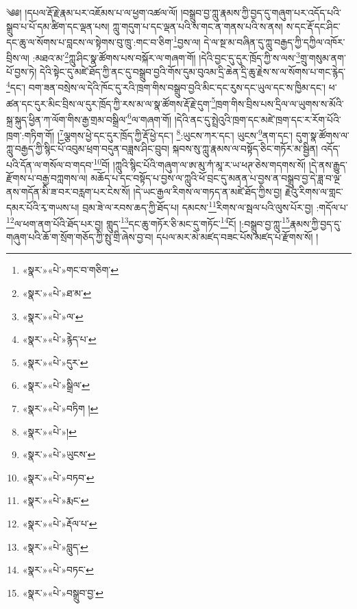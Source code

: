 ༄༅། །དཔལ་རྡོ་རྗེ་རྣམ་པར་འཇོམས་པ་ལ་ཕྱག་འཚལ་ལོ། །བསྒྲུབ་བྱ་ཀླུ་རྣམས་ཀྱི་བྱད་དུ་གཞུག་པར་འདོད་པའི་སྒྲུབ་པ་པོ་དམ་ཚིག་དང་ལྡན་པས། ཀླུ་གདུག་པ་དང་ལྡན་པའི་ས་གང་ན་གནས་པའི་ས་ནས། ས་དང་རྡོ་དང་ཤིང་དང་ཆུ་ལ་སོགས་པ་བླངས་ལ་སྟེགས་བུ་ཁྲུ་:གང་བ་ཅིག་\footnote{«སྣར་»«པེ་»གང་བ་གཅིག་}བྱས་ལ། དེ་ལ་སྔ་མ་བཞིན་དུ་ཀླུ་བརྒྱད་ཀྱི་དཀྱིལ་འཁོར་བྲིས་ལ། :མཐའ་མ་\footnote{«སྣར་»«པེ་»ཐ་མ་}ཀླུ་ཤིང་སྣ་ཚོགས་པས་བསྐོར་ལ་གཞག་གོ། །དེའི་བྱང་དུ་དུར་ཁྲོད་ཀྱི་ས་ལས་\footnote{«སྣར་»«པེ་»ལ་}གྲུ་གསུམ་ནག་པོ་བྱས་ཏེ། དེའི་སྟེང་དུ་མཛེ་ཐོད་ཀྱི་ནང་དུ་བསྒྲུབ་བྱའི་གོས་དུམ་བུའམ་དྲི་ཆེན་དྲི་ཆུ་རྗེས་ས་ལ་སོགས་པ་གང་རྙེད་\footnote{«སྣར་»«པེ་»རྙེད་པ་}དང་། བག་ཟན་བསྲེས་ལ་དེའི་ཁོང་དུ་རའི་ཁྲག་གིས་བསྒྲུབ་བྱའི་མིང་དང་རུས་དང་ཡུལ་དང་ས་ཁྱིམ་དང་། ཕ་ཚན་དང་དུར་མིང་བྲིས་ལ་དུར་ཁྲོད་ཀྱི་རས་མ་ལ་སྣ་ཚོགས་རྡོ་རྗེ་དུག་\footnote{«སྣར་»«པེ་»དུར་}ཁྲག་གིས་བྲིས་པས་དྲིལ་ལ་ཡུགས་ས་མོའི་སྐྲ་སྐུད་ཕྱིན་ཀ་ལོག་གིས་རྒྱ་གྲམ་བསྒྲིལ་\footnote{«སྣར་»«པེ་»སྒྲིལ་}ལ་གཞག་གོ། །དེའི་ནང་དུ་སྤྲེའུའི་ཁྲག་དང་མཛེ་ཁྲག་དང་ར་རོག་པོའི་ཁྲག་:གཏིག་གོ། །\footnote{«སྣར་»«པེ་»བཏིག །}ལྕགས་ཕྱེ་དང་དུར་ཁྲོད་ཀྱི་རྡོ་ཕྱེ་དང་། \footnote{«སྣར་»«པེ་»།  }:ཡུངས་ཀར་དང་། ཡུངས་\footnote{«སྣར་»«པེ་»ཡུངས་}ནག་དང་། དུག་སྣ་ཚོགས་ལ་ཀླུ་བརྒྱད་ཀྱི་སྙིང་པོ་འབུམ་ཕྲག་བདུན་བཟླས་ཤིང་བྲུབ། སྐབས་སུ་ཀླུ་རྣམས་ལ་བསྟོད་ཅིང་གཏོར་མ་སྦྱིན། འདོད་པའི་དོན་ལ་གསོལ་བ་གདབ་\footnote{«སྣར་»«པེ་»བཏབ་}བོ། །ཀླུའི་སྙིང་པོའི་གཞུག་ལ་ཨ་མུ་ཀཾ་མཱ་ར་ཡ་ཕཊ་ཅེས་གདགས་སོ། །དེ་ནས་རྒྱུད་རྫོགས་པ་བརྒྱ་བཀླགས་ལ། མཆོད་པ་དང་བསྟོད་པ་བྱས་ལ་ཀླུའི་ཕོ་བྲང་དུ་མནན་པ་བྱས་ན་བསྒྲུབ་བྱ་དེ་ཟླ་བ་ལྔ་ནས་གདོན་མི་ཟ་བར་བརླག་པར་ངེས་སོ། །དེ་ཡང་རྒྱལ་རིགས་ལ་གཏད་ན་མཛེ་ཐོད་ཀྱིས་བྱ། རྗེའུ་རིགས་ལ་གླང་དམར་པོའི་རྭ་གཡས་པ། བྲམ་ཟེ་ལ་རབས་ཆད་ཀྱི་ཐོད་པ། དམངས་\footnote{«སྣར་»«པེ་»རྨང་}རིགས་ལ་སྦལ་པའི་ལུས་པོར་བྱ། :གདོལ་པ་\footnote{«སྣར་»«པེ་»རྡོལ་པ་}ལ་ཕག་ནག་པོའི་ཐོད་པར་བྱ། གླུད་\footnote{«སྣར་»«པེ་»བླུད་}དང་ཆུ་གཏོར་ཅི་མང་དུ་གཏོང་\footnote{«སྣར་»«པེ་»བཏང་}ངོ། །:བསྒྲུབ་བྱ་ཀླུ་\footnote{«སྣར་»«པེ་»བསྒྲུབ་བྱ་}རྣམས་ཀྱི་བྱད་དུ་གཞུག་པའི་ཆོ་ག་སྲོག་གཅོད་ཀྱི་སྤུ་གྲི་ཞེས་བྱ་བ། དཔལ་མར་མེ་མཛད་བཟང་པོས་མཛད་པ་རྫོགས་སོ། ། 